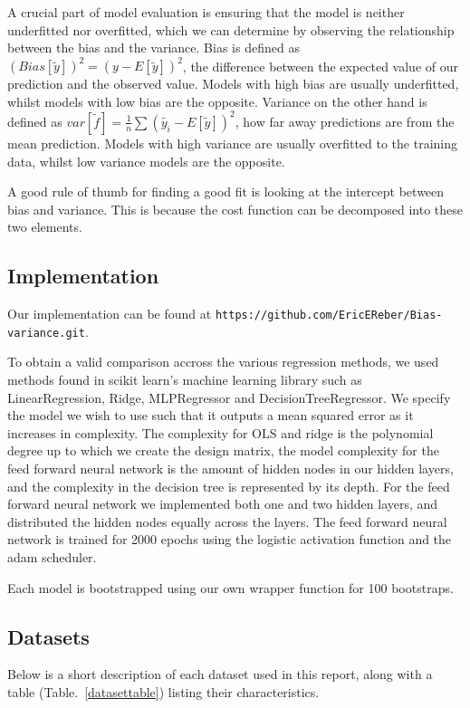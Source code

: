 \documentclass[onecolumn,10pt,cleanfoot]{asme2ej}
\begin{document}
A crucial part of model evaluation is ensuring that the model is neither underfitted nor overfitted, which we can determine by observing the relationship between the bias and the variance. Bias is defined as $(Bias[\tilde{y}])^2 = (y-E[\tilde{y}])^2$, the difference between the expected value of our prediction and the observed value. Models with high bias are usually underfitted, whilst models with low bias are the opposite. Variance on the other hand is defined as $var[\tilde{f}] = \frac{1}{n}\sum(\tilde{y_i}-E[\tilde{y}])^2$, how far away predictions are from the mean prediction. Models with high variance are usually overfitted to the training data, whilst low variance models are the opposite.

A good rule of thumb for finding a good fit is looking at the intercept between bias and variance. This is because the cost function can be decomposed into these two elements.

\subsection{Implementation}

Our implementation can be found at \texttt{https://github.com/EricEReber/Bias-variance.git}.

To obtain a valid comparison accross the various regression methods, we used methods found in scikit learn's machine learning library such as  LinearRegression, Ridge, MLPRegressor and DecisionTreeRegressor. We specify the model we wish to use such that it outputs a mean squared error as it increases in complexity. The complexity for OLS and ridge is the polynomial degree up to which we create the design matrix, the model complexity for the feed forward neural network is the amount of hidden nodes in our hidden layers, and the complexity in the decision tree is represented by its depth. For the feed forward neural network we implemented both one and two hidden layers, and distributed the hidden nodes equally across the layers. The feed forward neural network is trained for 2000 epochs using the logistic activation function and the adam scheduler.

Each model is bootstrapped using our own wrapper function for 100 bootstraps.

\subsection{Datasets}

Below is a short description of each dataset used in this report, along with a table (Table.~\ref{datasettable}) listing their characteristics.
\end{document}
